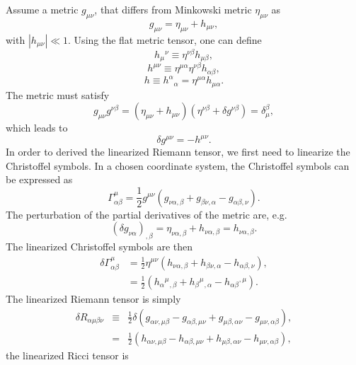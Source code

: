 \documentclass[12pt]{article}
\begin{document}
{Assume a metric  $g_{\mu\nu}$, that differs from Minkowski metric $\eta_{\mu\nu}$ as
\begin{equation}
\boxed{g_{\mu\nu}=\eta_{\mu\nu}+h_{\mu\nu}},
\end{equation}
with $ |h_{\mu\nu} |\ll 1 $. Using the flat metric tensor, one can define  \begin{equation}
 h_{\mu}{}^{\nu} \equiv \eta^{\nu\beta} h_{\mu\beta},
 \end{equation}
\begin{equation}
 h^{\mu\nu} \equiv \eta^{\mu\alpha} \eta^{\nu\beta} h_{\alpha\beta},
 \end{equation}
 \begin{equation}
 h \equiv h^\alpha{}_{\alpha}=\eta^{\mu\alpha}  h_{\mu\alpha}.
 \end{equation}
The metric must satisfy
\begin{equation}
 g_{\mu\nu} g^{\nu\beta} =(\eta_{\mu\nu}+h_{\mu\nu})(\eta^{\nu\beta}+\delta g^{\nu\beta})=\delta_{\mu}^{\beta},
 \end{equation} 
 which leads to 
\begin{equation}
 \delta g^{\mu\nu}=-h^{\mu\nu}.
 \end{equation}
 In order to derived the linearized Riemann tensor, we first need to linearize the Christoffel symbols. In a chosen coordinate system, the Christoffel symbols can be expressed as
\begin{equation}
\Gamma_{\alpha \beta}^{\mu}=\frac{1}{2} g^{\mu \nu}\left(g_{\nu \alpha, \beta}+g_{\beta \nu, \alpha}-g_{\alpha \beta, \nu}\right).
\end{equation}
The perturbation of the partial derivatives of the metric are, e.g.
$$
(\delta g_{\nu \alpha})_{, \beta}=\eta_{\nu \alpha, \beta}+h_{\nu \alpha, \beta}=h_{\nu \alpha, \beta}.
$$
The linearized Christoffel symbols are then
$$
\begin{aligned} \delta \Gamma_{\alpha \beta}^{\mu} &=\frac{1}{2} \eta^{\mu \nu}\left(h_{\nu \alpha, \beta}+h_{\beta \nu, \alpha}-h_{\alpha \beta, \nu}\right), \\ &=\frac{1}{2}\left(h_{\alpha}{}^{\mu}{}_{, \beta}
+ h_{\beta}{}^{\mu}{}_{, \alpha} - h_{\alpha\beta}{}^{,\mu}{}\right).
 \end{aligned}
$$
The linearized Riemann tensor is
simply\begin{eqnarray}
\delta R_{\alpha\mu\beta\nu} & \equiv & \frac{1}{2} \delta (g_{\alpha\nu,\mu\beta}-g_{\alpha\beta,\mu\nu}+g_{\mu\beta,\alpha\nu}-g_{\mu\nu,\alpha\beta}),\nonumber
\\
& = & \frac{1}{2}(h_{\alpha\nu,\mu\beta}-h_{\alpha\beta,\mu\nu}+h_{\mu\beta,\alpha\nu}-h_{\mu\nu,\alpha\beta}),
\end{eqnarray}
the linearized Ricci tensor is


}
\end{document}
